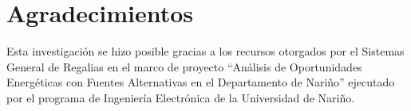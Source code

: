 \documentclass[conference, spanish]{IEEEtran}
\begin{document}
  \section*{Agradecimientos}
\fi

Esta investigación se hizo posible gracias a los recursos otorgados por el Sistemas General de Regalias en el marco de proyecto ``Análisis de Oportunidades Energéticas con Fuentes Alternativas en el Departamento de Nariño'' ejecutado por el programa de Ingeniería Electrónica de la Universidad de Nariño.

\ifCLASSOPTIONcaptionsoff
  \newpage
\fi




\end{document}
